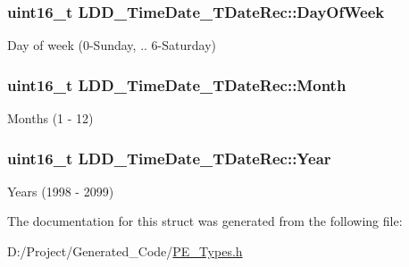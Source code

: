 \subsubsection[{Day\+Of\+Week}]{\setlength{\rightskip}{0pt plus 5cm}uint16\+\_\+t L\+D\+D\+\_\+\+Time\+Date\+\_\+\+T\+Date\+Rec\+::\+Day\+Of\+Week}\label{struct_l_d_d___time_date___t_date_rec_a11ed8bc2e3fbd80252a7d4802d316f1c}
Day of week (0-\/\+Sunday, .. 6-\/\+Saturday) \hypertarget{struct_l_d_d___time_date___t_date_rec_a28aaeffe98b07d60db379d12269fa822}{}
\subsubsection[{Month}]{\setlength{\rightskip}{0pt plus 5cm}uint16\+\_\+t L\+D\+D\+\_\+\+Time\+Date\+\_\+\+T\+Date\+Rec\+::\+Month}\label{struct_l_d_d___time_date___t_date_rec_a28aaeffe98b07d60db379d12269fa822}
Months (1 -\/ 12) \hypertarget{struct_l_d_d___time_date___t_date_rec_a58eee644efb4f46adc3437063c7bc194}{}
\subsubsection[{Year}]{\setlength{\rightskip}{0pt plus 5cm}uint16\+\_\+t L\+D\+D\+\_\+\+Time\+Date\+\_\+\+T\+Date\+Rec\+::\+Year}\label{struct_l_d_d___time_date___t_date_rec_a58eee644efb4f46adc3437063c7bc194}
Years (1998 -\/ 2099) 

The documentation for this struct was generated from the following file\+:\begin{DoxyCompactItemize}
\item 
D\+:/\+Project/\+Generated\+\_\+\+Code/\hyperlink{_p_e___types_8h}{P\+E\+\_\+\+Types.\+h}\end{DoxyCompactItemize}
